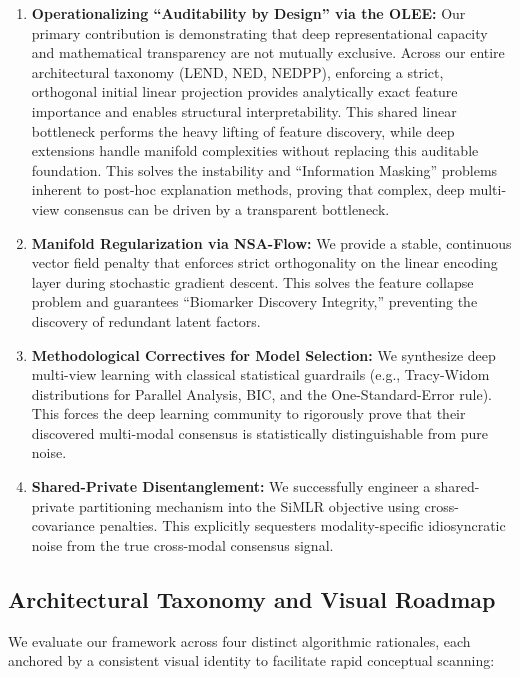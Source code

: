\documentclass[
  letterpaper,
]{report}
\providecommand{\tightlist}{%
  \setlength{\itemsep}{0pt}\setlength{\parskip}{0pt}}
\begin{document}
\begin{enumerate}
\def\labelenumi{\arabic{enumi}.}
\tightlist
\item
  \textbf{Operationalizing ``Auditability by Design'' via the OLEE:} Our
  primary contribution is demonstrating that deep representational
  capacity and mathematical transparency are not mutually exclusive.
  Across our entire architectural taxonomy (LEND, NED, NEDPP), enforcing
  a strict, orthogonal initial linear projection provides analytically
  exact feature importance and enables structural interpretability. This
  shared linear bottleneck performs the heavy lifting of feature
  discovery, while deep extensions handle manifold complexities without
  replacing this auditable foundation. This solves the instability and
  ``Information Masking'' problems inherent to post-hoc explanation
  methods, proving that complex, deep multi-view consensus can be driven
  by a transparent bottleneck.
\item
  \textbf{Manifold Regularization via NSA-Flow:} We provide a stable,
  continuous vector field penalty that enforces strict orthogonality on
  the linear encoding layer during stochastic gradient descent. This
  solves the feature collapse problem and guarantees ``Biomarker
  Discovery Integrity,'' preventing the discovery of redundant latent
  factors.
\item
  \textbf{Methodological Correctives for Model Selection:} We synthesize
  deep multi-view learning with classical statistical guardrails (e.g.,
  Tracy-Widom distributions for Parallel Analysis, BIC, and the
  One-Standard-Error rule). This forces the deep learning community to
  rigorously prove that their discovered multi-modal consensus is
  statistically distinguishable from pure noise.
\item
  \textbf{Shared-Private Disentanglement:} We successfully engineer a
  shared-private partitioning mechanism into the SiMLR objective using
  cross-covariance penalties. This explicitly sequesters
  modality-specific idiosyncratic noise from the true cross-modal
  consensus signal.
\end{enumerate}

\subsection{Architectural Taxonomy and Visual
Roadmap}\label{architectural-taxonomy-and-visual-roadmap}

We evaluate our framework across four distinct algorithmic rationales,
each anchored by a consistent visual identity to facilitate rapid
conceptual scanning:
\end{document}

